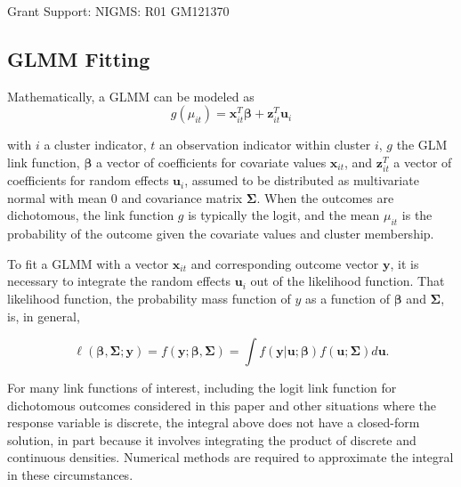 \documentclass[Afour,times,sagev,doublespace]{sagej}
\begin{document}
\begin{funding}
Grant Support: NIGMS: R01 GM121370
\end{funding}

\begin{sm}

\subsection{GLMM Fitting}
Mathematically, a GLMM can be modeled as
    \begin{equation}
        g(\mu_{it})=\mathbf{x}^T_{it} \boldsymbol{\beta} + \mathbf{z}^T_{it}\mathbf{u}_i
    \end{equation}
    
    with
 $i$ a cluster indicator, $t$ an observation indicator within cluster $i$, $g$ the GLM link function, $\boldsymbol{\beta}$ a vector of coefficients for covariate values $\mathbf{x}_{it}$, and $\mathbf{z}^T_{it}$ a vector of coefficients for random effects $\mathbf{u}_i$, assumed to be distributed as multivariate normal with mean $0$ and covariance matrix $\mathbf{\Sigma}$. When the outcomes are dichotomous, the link function $g$ is typically the logit, and the mean $\mu_{it}$ is the probability of the outcome given the covariate values and cluster membership.
 
To fit a GLMM with a vector $\mathbf{x}_{it}$ and corresponding outcome vector $\mathbf{y}$, it is necessary to integrate the random effects $\mathbf{u}_i$ out of the likelihood function\cite{rodriguez_assessment_1995}. That likelihood function, the probability mass function of $y$ as a function of $\boldsymbol{\beta}$ and $\mathbf{\Sigma}$\cite{agresti_categorical_2013}, is, in general,

\begin{equation}
 \ell(\boldsymbol{\beta}, \mathbf{\Sigma} ; \mathbf{y})=f(\mathbf{y};\boldsymbol{\beta}, \mathbf{\Sigma})=\int f(\mathbf{y}|\mathbf{u};\boldsymbol{\beta})f(\mathbf{u}; \mathbf{\Sigma})d\mathbf{u}.   
\end{equation}

For many link functions of interest, including the logit link function for dichotomous outcomes considered in this paper and other situations where the response variable is discrete, the integral above does not have a closed-form solution, in part because it involves integrating the product of discrete and continuous densities\cite{ng_estimation_2006}. Numerical methods are required to approximate the integral in these circumstances.


\end{sm}
\end{document}
